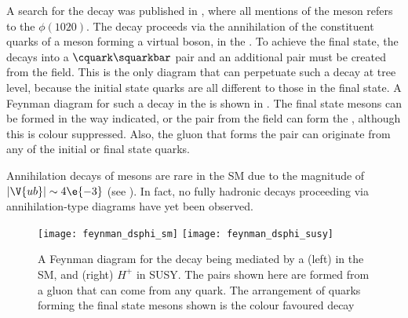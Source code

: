 A search for the decay \btodsphi was published in , where all mentions of
the \phii meson refers to the $\phi(1020)$.
The decay \btodsphi proceeds via the annihilation of the constituent quarks of a \Bp meson
forming a virtual \Wp boson, in the \sm.
To achieve the final state, the \Wp decays into a $\cquark\squarkbar$ pair and an additional
\ssbar pair must be created from the \QCD field.
This is the only diagram that can perpetuate such a decay at tree level, because the initial state
quarks are all different to those in the final state.
A Feynman diagram for such a decay in the \sm
is shown in .
The final state mesons can be formed in the way indicated, or the \ssbar pair from the \QCD field
can form the \phii, although this is colour suppressed.
Also, the gluon that forms the \ssbar pair can originate from any of the initial or final state
quarks.

Annihilation decays of \Bp mesons are rare in the SM due to the magnitude of
$|\V{ub}|\sim4\e{-3}$ (see ).
In fact, no fully hadronic decays proceeding via annihilation-type diagrams have yet been
observed.


\begin{figure}
  \begin{center}
    \texttt{[image: feynman\_dsphi\_sm]}
    \texttt{[image: feynman\_dsphi\_susy]}
    \caption[Feynman diagram for the decay \btodsphi]
    {
      A Feynman diagram for the decay \btodsphi being mediated by a
      (left) \Wp in the SM, and
      (right) $H^+$ in SUSY.
      The \ssbar pairs shown here are formed from a gluon that can come from any quark.
      The arrangement of quarks forming the final state mesons shown is the colour favoured decay
    }
    \label{fig:dsphi:feyn}
  \end{center}
\end{figure}



